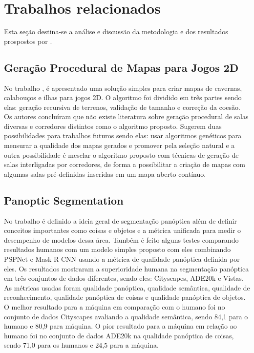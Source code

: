 \section{Trabalhos relacionados}

Esta seção destina-se a análise e discussão da metodologia e dos resultados prospostos por .

\subsection*{Geração Procedural de Mapas para Jogos 2D}

No trabalho , é apresentado uma solução simples para criar mapas de cavernas, calabouços e ilhas para jogos 2D. O algoritmo foi dividido em três partes sendo elas: geração recursiva de terrenos, validação de tamanho e correção da coesão. Os autores concluíram que não existe literatura sobre geração procedural de salas diversas e corredores distintos como o algoritmo proposto. Sugerem duas possibilidades para trabalhos futuros sendo elas: usar algoritmos genéticos para mensurar a qualidade dos mapas gerados e promover pela seleção natural e a outra possibilidade é mesclar o algoritmo proposto com técnicas de geração de salas interligadas por corredores, de forma a possibilitar a criação de mapas com algumas salas pré-definidas inseridas em um mapa aberto contínuo.

\subsection*{Panoptic Segmentation}

No trabalho  é definido a ideia geral de segmentação panóptica além de definir conceitos importantes como coisas e objetos e a métrica unificada para medir o desempenho de modelos dessa área. Também é feito alguns testes comparando resultados humanos com um modelo simples proposto com eles combinando PSPNet e Mask R-CNN usando a métrica de qualidade panóptica definida por eles. Os resultados mostraram a superioridade humana na segmentação panóptica em três conjuntos de dados diferentes, sendo eles: Cityscapes, ADE20k e Vistas. As métricas usadas foram qualidade panóptica, qualidade semântica, qualidade de reconhecimento, qualidade panóptica
 de coisas e qualidade panóptica de objetos. O melhor resultado para a máquina em comparação com o humano foi no conjunto de dados Cityscapes avaliando a qualidade semântica, sendo 84,1 para o humano e 80,9 para máquina. O pior resultado para a máquina em relação ao humano foi no conjunto de dados ADE20k na qualidade panóptica de coisas, sendo 71,0 para os humanos e 24,5 para a máquina.

